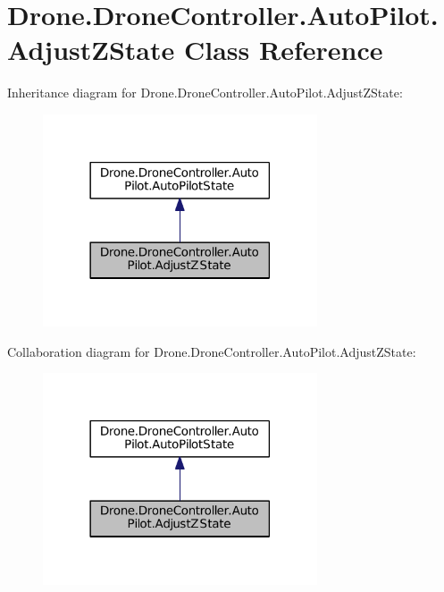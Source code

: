 \hypertarget{class_drone_1_1_drone_controller_1_1_auto_pilot_1_1_adjust_z_state}{}\section{Drone.\+Drone\+Controller.\+Auto\+Pilot.\+Adjust\+Z\+State Class Reference}
\label{class_drone_1_1_drone_controller_1_1_auto_pilot_1_1_adjust_z_state}


Inheritance diagram for Drone.\+Drone\+Controller.\+Auto\+Pilot.\+Adjust\+Z\+State\+:\nopagebreak
\begin{figure}[H]
\begin{center}
\leavevmode
\includegraphics[width=230pt]{class_drone_1_1_drone_controller_1_1_auto_pilot_1_1_adjust_z_state__inherit__graph}
\end{center}
\end{figure}


Collaboration diagram for Drone.\+Drone\+Controller.\+Auto\+Pilot.\+Adjust\+Z\+State\+:\nopagebreak
\begin{figure}[H]
\begin{center}
\leavevmode
\includegraphics[width=230pt]{class_drone_1_1_drone_controller_1_1_auto_pilot_1_1_adjust_z_state__coll__graph}
\end{center}
\end{figure}
